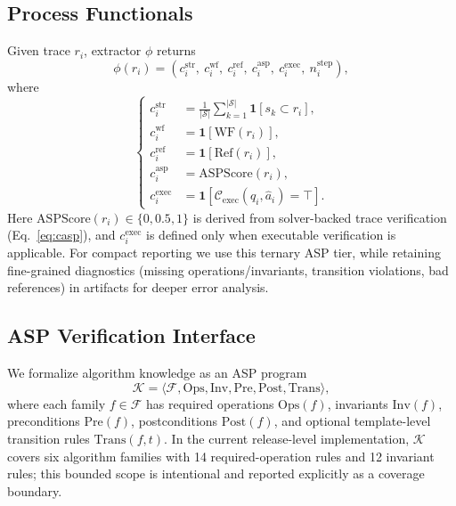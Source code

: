 \documentclass{article}
\begin{document}
\subsection{Process Functionals}
Given trace \(r_i\), extractor \(\phi\) returns
\begin{equation}
\label{eq:phi-tuple}
\phi(r_i)=\left(c_i^{\text{str}},\ c_i^{\text{wf}},\ c_i^{\text{ref}},\ c_i^{\text{asp}},\ c_i^{\text{exec}},\ n_i^{\text{step}}\right),
\end{equation}
where
\begin{equation}
\label{eq:phi-components}
\left\{
\begin{aligned}
c_i^{\text{str}} &= \frac{1}{|\mathcal{S}|}\sum_{k=1}^{|\mathcal{S}|}\mathbf{1}[s_k\subset r_i],\\
c_i^{\text{wf}} &= \mathbf{1}[\mathrm{WF}(r_i)],\\
c_i^{\text{ref}} &= \mathbf{1}[\mathrm{Ref}(r_i)],\\
c_i^{\text{asp}} &= \mathrm{ASPScore}(r_i),\\
c_i^{\text{exec}} &= \mathbf{1}[\mathcal{C}_{\text{exec}}(q_i,\hat a_i)=\top].
\end{aligned}
\right.
\end{equation}
Here \(\mathrm{ASPScore}(r_i)\in\{0,0.5,1\}\) is derived from solver-backed trace verification (Eq.~\eqref{eq:casp}), and \(c_i^{\text{exec}}\) is defined only when executable verification is applicable.
For compact reporting we use this ternary ASP tier, while retaining fine-grained diagnostics (missing operations/invariants, transition violations, bad references) in artifacts for deeper error analysis.

\subsection{ASP Verification Interface}
We formalize algorithm knowledge as an ASP program
\begin{equation}
\label{eq:knowledge-base}
\mathcal{K}=\langle \mathcal{F},\mathrm{Ops},\mathrm{Inv},\mathrm{Pre},\mathrm{Post},\mathrm{Trans}\rangle,
\end{equation}
where each family \(f\in\mathcal{F}\) has required operations \(\mathrm{Ops}(f)\), invariants \(\mathrm{Inv}(f)\), preconditions \(\mathrm{Pre}(f)\), postconditions \(\mathrm{Post}(f)\), and optional template-level transition rules \(\mathrm{Trans}(f,t)\).
In the current release-level implementation, \(\mathcal{K}\) covers six algorithm families with 14 required-operation rules and 12 invariant rules; this bounded scope is intentional and reported explicitly as a coverage boundary.
\end{document}
